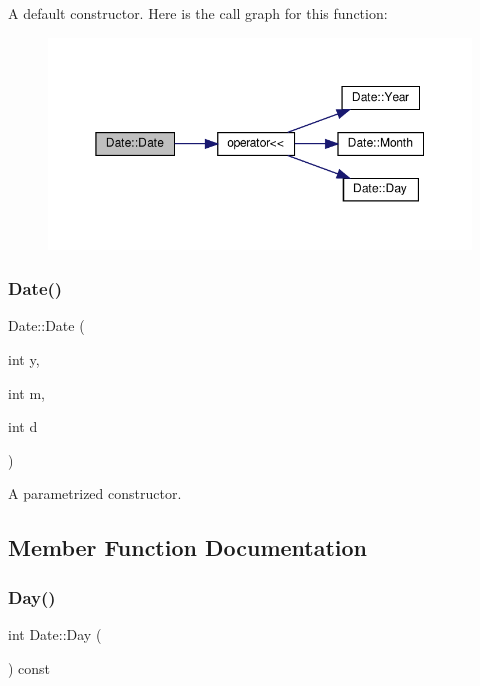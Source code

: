 A default constructor. Here is the call graph for this function\+:\nopagebreak
\begin{figure}[H]
\begin{center}
\leavevmode
\includegraphics[width=350pt]{class_date_a4e59ed4ba66eec61c27460c5d09fa1bd_cgraph}
\end{center}
\end{figure}
\mbox{\label{class_date_af80a5016fde0d599f0a15900193fc663}} 
\subsubsection{\texorpdfstring{Date()}{Date()}\hspace{0.1cm}{\footnotesize\ttfamily [2/2]}}
{\footnotesize\ttfamily Date\+::\+Date (\begin{DoxyParamCaption}\item[{int}]{y,  }\item[{int}]{m,  }\item[{int}]{d }\end{DoxyParamCaption})}

A parametrized constructor. 

\subsection{Member Function Documentation}
\mbox{\label{class_date_ad7f2e4e42aadc85322503dbef8484ad5}} 
\subsubsection{\texorpdfstring{Day()}{Day()}}
{\footnotesize\ttfamily int Date\+::\+Day (\begin{DoxyParamCaption}{ }\end{DoxyParamCaption}) const}

